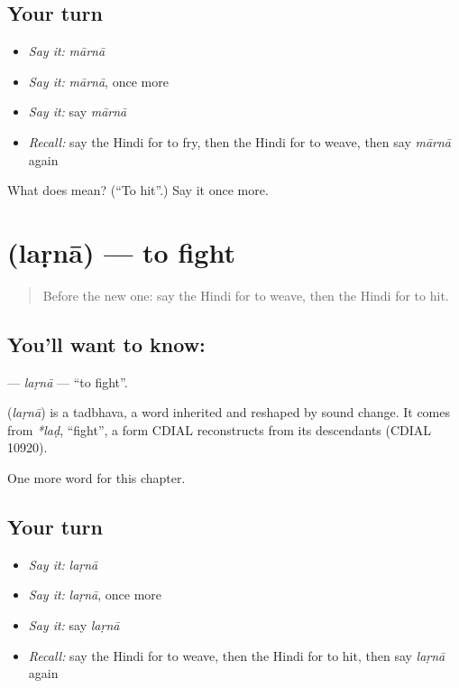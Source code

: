 \subsection*{Your turn}
\begin{itemize}
\raggedright
  \item \emph{Say it:} \emph{mārnā}
  \item \emph{Say it:} \emph{mārnā}, once more
  \item \emph{Say it:} say \emph{mārnā}
  \item \emph{Recall:} say the Hindi for to fry, then the Hindi for to weave, then say \emph{mārnā} again
\end{itemize}

\begin{tcolorbox}[breakable,colback=teal!4,colframe=teal!35!black,title={Before you move on}]
What does  mean? (\textquotedblleft{}To hit\textquotedblright{}.) Say it once more.
\end{tcolorbox}
\section[\texorpdfstring{\hi{लड़ना} (laṛnā)}{लड़ना (laṛnā)}]{ (laṛnā) — to fight}

\label{lesson:HI-C178-larna}



\begin{quote}
Before the new one: say the Hindi for to weave, then the Hindi for to hit.
\end{quote}

\subsection*{You'll want to know: }
\textbf{} — \emph{laṛnā} — \textquotedblleft{}to fight\textquotedblright{}.

\begin{cousinweb}
\textbf{} (\emph{laṛnā}) is a tadbhava, a word inherited and reshaped by sound change. It comes from \emph{*laḍ}, \textquotedblleft{}fight\textquotedblright{}, a form CDIAL reconstructs from its descendants (CDIAL 10920).
\end{cousinweb}

\begin{grammarlens}[title={What you've built}]
One more word for this chapter.
\end{grammarlens}

\subsection*{Your turn}
\begin{itemize}
\raggedright
  \item \emph{Say it:} \emph{laṛnā}
  \item \emph{Say it:} \emph{laṛnā}, once more
  \item \emph{Say it:} say \emph{laṛnā}
  \item \emph{Recall:} say the Hindi for to weave, then the Hindi for to hit, then say \emph{laṛnā} again
\end{itemize}

